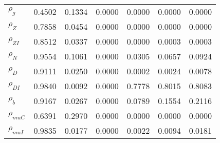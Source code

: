 \begin{center}
\begin{longtable}{lcccccc}
$ {\rho_g}             $	 & 	          0.4502	 & 	          0.1334	 & 	          0.0000	 & 	          0.0000	 & 	          0.0000	 & 	          0.0000 \\ 
$ {\rho_Z}             $	 & 	          0.7858	 & 	          0.0454	 & 	          0.0000	 & 	          0.0000	 & 	          0.0000	 & 	          0.0000 \\ 
$ {\rho_{ZI}}          $	 & 	          0.8512	 & 	          0.0337	 & 	          0.0000	 & 	          0.0000	 & 	          0.0003	 & 	          0.0003 \\ 
$ {\rho_N}             $	 & 	          0.9554	 & 	          0.1061	 & 	          0.0000	 & 	          0.0305	 & 	          0.0657	 & 	          0.0924 \\ 
$ {\rho_D}             $	 & 	          0.9111	 & 	          0.0250	 & 	          0.0000	 & 	          0.0002	 & 	          0.0024	 & 	          0.0078 \\ 
$ {\rho_{DI}}          $	 & 	          0.9840	 & 	          0.0092	 & 	          0.0000	 & 	          0.7778	 & 	          0.8015	 & 	          0.8083 \\ 
$ {\rho_b}             $	 & 	          0.9167	 & 	          0.0267	 & 	          0.0000	 & 	          0.0789	 & 	          0.1554	 & 	          0.2116 \\ 
$ {\rho_{muC}}         $	 & 	          0.6391	 & 	          0.2970	 & 	          0.0000	 & 	          0.0000	 & 	          0.0000	 & 	          0.0000 \\ 
$ {\rho_{muI}}         $	 & 	          0.9835	 & 	          0.0177	 & 	          0.0000	 & 	          0.0022	 & 	          0.0094	 & 	          0.0181 \\ 
\end{longtable}
 \end{center}

